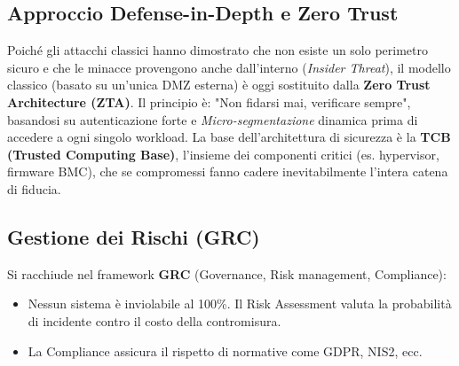 \subsection{Approccio Defense-in-Depth e Zero Trust}
Poiché gli attacchi classici hanno dimostrato che non esiste un solo perimetro sicuro e che le minacce provengono anche dall'interno (\textit{Insider Threat}), il modello classico (basato su un'unica DMZ esterna) è oggi sostituito dalla \textbf{Zero Trust Architecture (ZTA)}. Il principio è: "Non fidarsi mai, verificare sempre", basandosi su autenticazione forte e \textit{Micro-segmentazione} dinamica prima di accedere a ogni singolo workload.
La base dell'architettura di sicurezza è la \textbf{TCB (Trusted Computing Base)}, l'insieme dei componenti critici (es. hypervisor, firmware BMC), che se compromessi fanno cadere inevitabilmente l'intera catena di fiducia.

\subsection{Gestione dei Rischi (GRC)}
Si racchiude nel framework \textbf{GRC} (Governance, Risk management, Compliance):
\begin{itemize}
    \item Nessun sistema è inviolabile al 100\%. Il Risk Assessment valuta la probabilità di incidente contro il costo della contromisura.
    \item La Compliance assicura il rispetto di normative come GDPR, NIS2, ecc.
\end{itemize}

